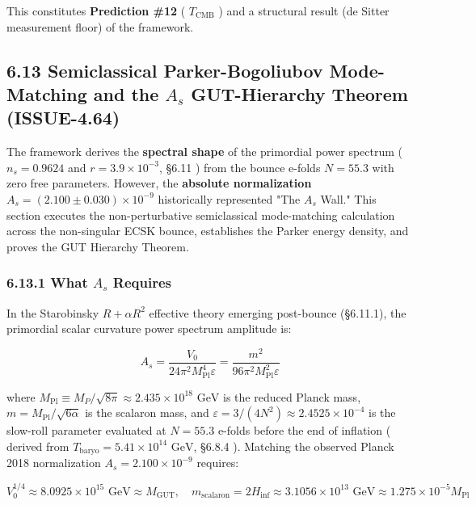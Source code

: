 \documentclass[11pt,a4paper]{article}
\theoremstyle{definition}
\theoremstyle{remark}
\begin{document}
This constitutes \textbf{Prediction \#12} ( $T_{\text{CMB}}$ ) and a structural result (de Sitter measurement floor) of the framework.

\subsection{6.13 Semiclassical Parker-Bogoliubov Mode-Matching and the $A_s$ GUT-Hierarchy Theorem (ISSUE-4.64)}

The framework derives the \textbf{spectral shape} of the primordial power spectrum ( $n_s = 0.9624$ and $r = 3.9 \times 10^{-3}$, \S 6.11 ) from the bounce e-folds $N = 55.3$ with zero free parameters. However, the \textbf{absolute normalization} $A_s = (2.100 \pm 0.030) \times 10^{-9}$ historically represented "The $A_s$ Wall." This section executes the non-perturbative semiclassical mode-matching calculation across the non-singular ECSK bounce, establishes the Parker energy density, and proves the GUT Hierarchy Theorem.

\subsubsection{6.13.1 What $A_s$ Requires}

In the Starobinsky $R + \alpha R^2$ effective theory emerging post-bounce (\S 6.11.1), the primordial scalar curvature power spectrum amplitude is:


\begin{equation}
A_s = \frac{V_0}{24\pi^2 M_{\text{Pl}}^4 \varepsilon} = \frac{m^2}{96\pi^2 M_{\text{Pl}}^2 \varepsilon}
\end{equation}


where $M_{\text{Pl}} \equiv M_P / \sqrt{8\pi} \approx 2.435 \times 10^{18}\text{ GeV}$ is the reduced Planck mass, $m = M_{\text{Pl}} / \sqrt{6\alpha}$ is the scalaron mass, and $\varepsilon = 3/(4N^2) \approx 2.4525 \times 10^{-4}$ is the slow-roll parameter evaluated at $N = 55.3$ e-folds before the end of inflation ( derived from $T_{\text{baryo}} = 5.41 \times 10^{14}\text{ GeV}$, \S 6.8.4 ). Matching the observed Planck 2018 normalization $A_s = 2.100 \times 10^{-9}$ requires:


\begin{equation}
\boxed{V_0^{1/4} \approx 8.0925 \times 10^{15} \text{ GeV} \approx M_{\text{GUT}}, \quad m_{\text{scalaron}} = 2 H_{\text{inf}} \approx 3.1056 \times 10^{13} \text{ GeV} \approx 1.275 \times 10^{-5} M_{\text{Pl}}}
\end{equation}
\end{document}
